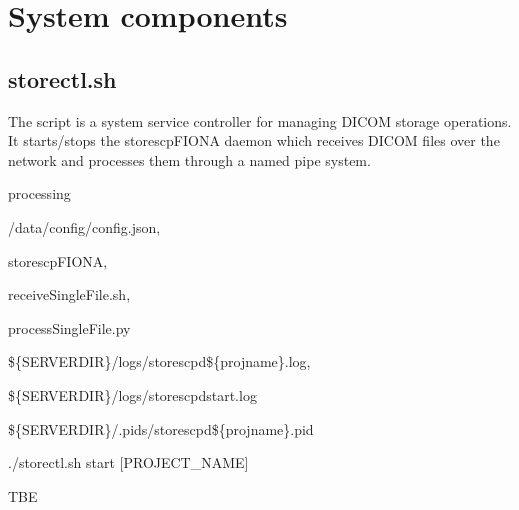 \documentclass[letterpaper,10pt,english]{sphinxmanual}
\begin{document}
\sphinxstepscope


\section{System components}
\label{\detokenize{Architecture/scripts:system-components}}\label{\detokenize{Architecture/scripts::doc}}
\sphinxstepscope


\subsection{storectl.sh}
\label{\detokenize{Architecture/scripts/storectl:storectl-sh}}\label{\detokenize{Architecture/scripts/storectl::doc}}
\sphinxAtStartPar
The  script is a system service controller for managing DICOM storage operations. It starts/stops the storescpFIONA daemon which receives DICOM files over the network and processes them through a named pipe system.

\sphinxAtStartPar
{}

\begin{DUlineblock}{0em}
\item[] \sphinxhyphen{}  processing
\item[] \sphinxhyphen{} 
\item[]
\begin{DUlineblock}{\DUlineblockindent}
\item[] \sphinxhyphen{} /data/config/config.json,
\item[] \sphinxhyphen{} storescpFIONA,
\item[] \sphinxhyphen{} receiveSingleFile.sh,
\item[] \sphinxhyphen{} processSingleFile.py
\end{DUlineblock}
\item[] \sphinxhyphen{} 
\item[]
\begin{DUlineblock}{\DUlineblockindent}
\item[] \sphinxhyphen{} \$\{SERVERDIR\}/logs/storescpd\$\{projname\}.log,
\item[] \sphinxhyphen{} \$\{SERVERDIR\}/logs/storescpd\sphinxhyphen{}start.log
\end{DUlineblock}
\item[] \sphinxhyphen{}  \$\{SERVERDIR\}/.pids/storescpd\$\{projname\}.pid
\item[] \sphinxhyphen{}  ./storectl.sh start {[}PROJECT\_NAME{]}
\item[] \sphinxhyphen{}  TBE
\end{DUlineblock}
\end{document}
